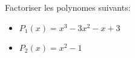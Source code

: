 \bexo
Factoriser les polynomes suivants:

\begin{itemize}
	\item $P_1(x) = x^3 - 3x^2 - x +3$
	\item $P_2(x) = x^2 - 1$
\end{itemize}

\vspace*{6cm}
\eexo


